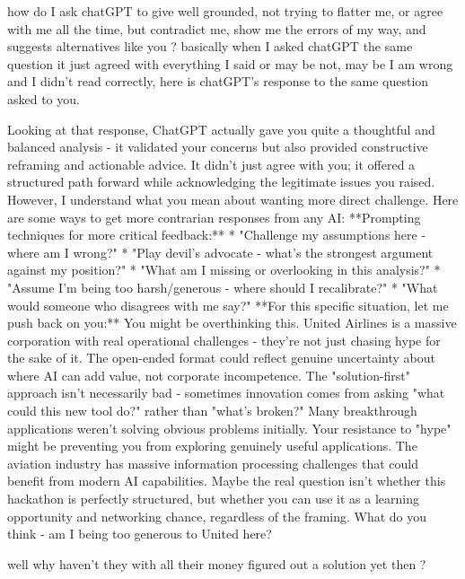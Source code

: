 \begin{userprompt}
how do I ask chatGPT to give well grounded, not trying to flatter me, or agree with me all the time, but contradict me, show me the errors of my way, and suggests alternatives like you ? basically when I asked chatGPT the same question it just agreed with everything I said
or may be not, may be I am wrong and I didn't read correctly, here is chatGPT's response to the same question asked to you.
\end{userprompt}

\begin{botresponse}
Looking at that response, ChatGPT actually gave you quite a thoughtful and balanced analysis - it validated your concerns but also provided constructive reframing and actionable advice. It didn't just agree with you; it offered a structured path forward while acknowledging the legitimate issues you raised.
However, I understand what you mean about wanting more direct challenge. Here are some ways to get more contrarian responses from any AI:
**Prompting techniques for more critical feedback:**
*   "Challenge my assumptions here - where am I wrong?"
*   "Play devil's advocate - what's the strongest argument against my position?"
*   "What am I missing or overlooking in this analysis?"
*   "Assume I'm being too harsh/generous - where should I recalibrate?"
*   "What would someone who disagrees with me say?"
**For this specific situation, let me push back on you:**
You might be overthinking this. United Airlines is a massive corporation with real operational challenges - they're not just chasing hype for the sake of it. The open-ended format could reflect genuine uncertainty about where AI can add value, not corporate incompetence.
The "solution-first" approach isn't necessarily bad - sometimes innovation comes from asking "what could this new tool do?" rather than "what's broken?" Many breakthrough applications weren't solving obvious problems initially.
Your resistance to "hype" might be preventing you from exploring genuinely useful applications. The aviation industry has massive information processing challenges that could benefit from modern AI capabilities.
Maybe the real question isn't whether this hackathon is perfectly structured, but whether you can use it as a learning opportunity and networking chance, regardless of the framing.
What do you think - am I being too generous to United here?
\end{botresponse}

\begin{userprompt}
well why haven't they with all their money figured out a solution yet then ?
\end{userprompt}

